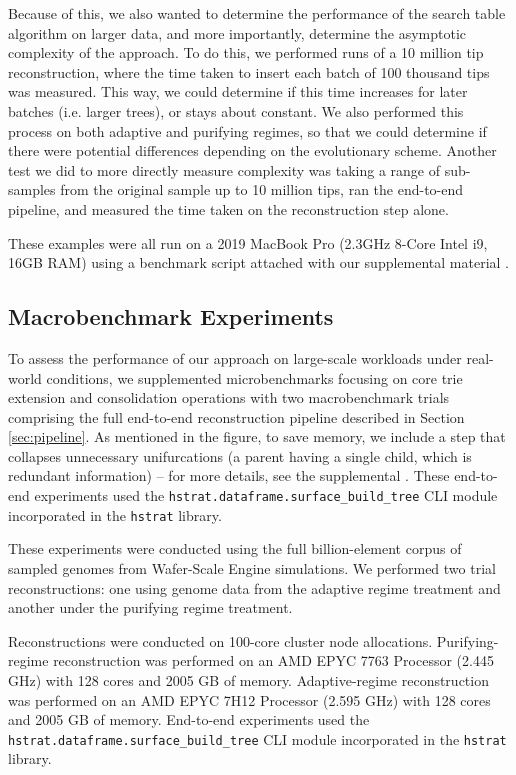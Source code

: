 Because of this, we also wanted to determine the performance of the search table algorithm on larger data, and more importantly, determine the asymptotic complexity of the approach. 
To do this, we performed runs of a 10 million tip reconstruction, where the time taken to insert each batch of 100 thousand tips was measured.
This way, we could determine if this time increases for later batches (i.e. larger trees), or stays about constant.
We also performed this process on both adaptive and purifying regimes, so that we could determine if there were potential differences depending on the evolutionary scheme.
Another test we did to more directly measure complexity was taking a range of sub-samples from the original sample up to 10 million tips, ran the end-to-end pipeline, and measured the time taken on the reconstruction step alone.

These examples were all run on a 2019 MacBook Pro (2.3GHz 8-Core Intel i9, 16GB RAM) using a benchmark script attached with our supplemental material \citep{supplemental}.

\subsection{Macrobenchmark Experiments}

To assess the performance of our approach on large-scale workloads under real-world conditions, we supplemented microbenchmarks focusing on core trie extension and consolidation operations with two macrobenchmark trials comprising the full end-to-end reconstruction pipeline described in Section \ref{sec:pipeline}.
As mentioned in the figure, to save memory, we include a step that collapses unnecessary unifurcations (a parent having a single child, which is redundant information) -- for more details, see the supplemental \citep{supplemental}.
These end-to-end experiments used the \texttt{hstrat.dataframe.surface\_build\_tree} CLI module incorporated in the \texttt{hstrat} library.

These experiments were conducted using the full billion-element corpus of sampled genomes from Wafer-Scale Engine simulations.
We performed two trial reconstructions: one using genome data from the adaptive regime treatment and another under the purifying regime treatment.

Reconstructions were conducted on 100-core cluster node allocations.
Purifying-regime reconstruction was performed on an AMD EPYC 7763 Processor (2.445 GHz) with 128 cores and 2005 GB of memory.
Adaptive-regime reconstruction was performed on an AMD EPYC 7H12 Processor (2.595 GHz) with 128 cores and 2005 GB of memory.
End-to-end experiments used the \texttt{hstrat.dataframe.surface\_build\_tree} CLI module incorporated in the \texttt{hstrat} library.

